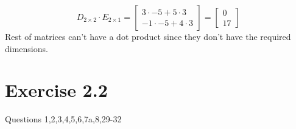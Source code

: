\documentclass[a4paper]{article}
\begin{document}
\[D_{2\times2} \cdot E_{2\times1}=
\begin{bmatrix}
3\cdot-5+5\cdot3\\
-1\cdot-5+4\cdot3
\end{bmatrix}=
\begin{bmatrix}
0\\
17
\end{bmatrix}
\]
Rest of matrices can't have a dot product since they don't have the required dimensions.\\

\section{Exercise 2.2}
Questions 1,2,3,4,5,6,7a,8,29-32\\
\end{document}
